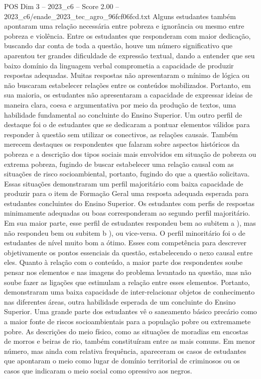 \begin{textsample}{POS Dim 3 – 2023\_c6 – Score 2.00 – 2023\_c6/enade\_2023\_tec\_agro\_96fcf06fcd.txt}
Alguns estudantes também apontaram uma relação necessária entre pobreza e ignorância ou mesmo entre pobreza e violência.
Entre os estudantes que responderam com maior dedicação, buscando dar conta de toda a questão, houve um número significativo que aparentou ter grandes dificuldade de expressão textual, dando a entender que seu baixo domínio da linguagem verbal comprometia a capacidade de produzir respostas adequadas.
Muitas respostas não apresentaram o mínimo de lógica ou não buscaram estabelecer relações entre os conteúdos mobilizados.
Portanto, em sua maioria, os estudantes não apresentaram a capacidade de expressar ideias de maneira clara, coesa e argumentativa por meio da produção de textos, uma habilidade fundamental ao concluinte do Ensino Superior.
Um outro perfil de destaque foi o de estudantes que se dedicaram a pontuar elementos válidos para responder à questão sem utilizar os conectivos, as relações causais.
Também merecem destaques os respondentes que falaram sobre aspectos históricos da pobreza e a descrição dos tipos sociais mais envolvidos em situação de pobreza ou extrema pobreza, fugindo de buscar estabelecer uma relação causal com as situações de risco socioambiental, portanto, fugindo do que a questão solicitava.
Essas situações demonstraram um perfil majoritário com baixa capacidade de produzir para o item de Formação Geral uma resposta adequada esperada para estudantes concluintes do Ensino Superior.
Os estudantes com perfis de respostas minimamente adequadas ou boas corresponderam ao segundo perfil majoritário.
Em sua maior parte, esse perfil de estudantes respondeu bem ao subitem a ), mas não respondeu bem ou subitem b ), ou vice-versa.
O perfil minoritário foi o de estudantes de nível muito bom a ótimo.
Esses com competência para descrever objetivamente os pontos essenciais da questão, estabelecendo o nexo causal entre eles.
Quanto à relação com o conteúdo, a maior parte dos respondentes soube pensar nos elementos e nas imagens do problema levantado na questão, mas não soube fazer as ligações que estimulam a relação entre esses elementos.
Portanto, demonstraram uma baixa capacidade de inter-relacionar objetos de conhecimento nas diferentes áreas, outra habilidade esperada de um concluinte do Ensino Superior.
Uma grande parte dos estudantes vê o saneamento básico precário como a maior fonte de riscos socioambientais para a população pobre ou extremamete pobre.
As descrições do meio físico, como as situações de moradias em encostas de morros e beiras de rio, também constituíram entre as mais comuns.
Em menor número, mas ainda com relativa frequência, apareceram os casos de estudantes que apontaram o meio como lugar de domínio territorial de criminosos ou os casos que indicaram o meio social como opressivo aos negros.

\end{textsample}
